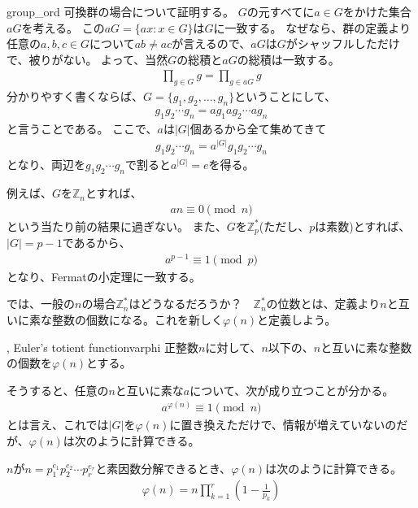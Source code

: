 \begin{thProof}{group_ord}
可換群の場合について証明する。
$G$の元すべてに$a\in{G}$をかけた集合$aG$を考える。
この$aG=\{ax:x\in{G}\}$は$G$に一致する。
なぜなら、群の定義より任意の$a,b,c\in{G}$について$ab\neq{ac}$が言えるので、$aG$は$G$がシャッフルしただけで、被りがない。
よって、当然$G$の総積と$aG$の総積は一致する。
\begin{align*}
\prod_{g\in{G}}g = \prod_{g\in{aG}}g
\end{align*}
分かりやすく書くならば、$G=\{g_1,g_2,\ldots,g_n\}$ということにして、
\begin{align*}
g_1g_2\cdots g_n = ag_1 ag_2 \cdots ag_n
\end{align*}
と言うことである。
ここで、$a$は$|G|$個あるから全て集めてきて
\begin{align*}
g_1g_2\cdots g_n = a^{|G|}g_1 g_2 \cdots g_n
\end{align*}
となり、両辺を$g_1g_2\cdots{g_n}$で割ると$a^{|G|}=e$を得る。
\end{thProof}

例えば、$G$を$\mathbb{Z}_n$とすれば、
\begin{align*}
an \equiv 0 \pmod{n}
\end{align*}
という当たり前の結果に過ぎない。
また、$G$を$\mathbb{Z}^*_p$(ただし、$p$は素数)とすれば、$|G|=p-1$であるから、
\begin{align*}
a^{p-1} \equiv 1 \pmod{p}
\end{align*}
となり、Fermatの小定理に一致する。

では、一般の$n$の場合$\mathbb{Z}^*_n$はどうなるだろうか？　$\mathbb{Z}^*_n$の位数とは、定義より$n$と互いに素な整数の個数になる。これを新しく$\varphi(n)$と定義しよう。

\begin{Defi}{, Euler's totient function}{varphi}
正整数$n$に対して、$n$以下の、$n$と互いに素な整数の個数を$\varphi(n)$とする。
\end{Defi}

そうすると、任意の$n$と互いに素な$a$について、次が成り立つことが分かる。
\begin{align*}
a^{\varphi(n)} \equiv 1 \pmod{n}
\end{align*}
とは言え、これでは$|G|$を$\varphi(n)$に置き換えただけで、情報が増えていないのだが、$\varphi(n)$は次のように計算できる。

\begin{Theo}{}{}
$n$が$n=p_1^{e_1}p_2^{e_2}\cdots p_r^{e_r}$と素因数分解できるとき、$\varphi(n)$は次のように計算できる。
\begin{align*}
\varphi(n) = n \prod_{k=1}^r \left( 1 - \frac{1}{p_k} \right)
\end{align*}
\end{Theo}

